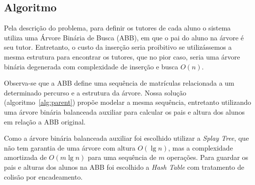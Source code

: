 \subsection{Algoritmo} \label{sec:algo}
Pela descrição do problema, para definir os tutores de cada aluno o sistema
utiliza uma Árvore Binária de Busca (ABB), em que o pai do aluno na árvore é seu
tutor. Entretanto, o custo da inserção seria proibitivo se utilizássemos a mesma
estrutura para encontrar os tutores, que no pior caso, seria uma árvore
binária degenerada com complexidade de inserção e busca $O(n)$.

Observa-se que a ABB define uma sequência de matrículas
relacionada a um determinado percurso e a estrutura da árvore. Nossa solução (algoritmo~\ref{alg:parent}) propõe 
modelar a mesma sequência, entretanto utilizando uma árvore binária balanceada auxiliar
para calcular os pais e altura dos alunos em relação a ABB original.

Como a árvore binária balanceada auxiliar foi escolhido utilizar a \textit{Splay Tree}, que não tem garantia de uma árvore com altura $O(\lg n)$, mas a complexidade amortizada de $O(m \lg n)$ para uma sequência de $m$ operações. Para guardar os pais e alturas dos alunos na ABB foi escolhido a \textit{Hash Table} com tratamento de colisão por encadeamento.

